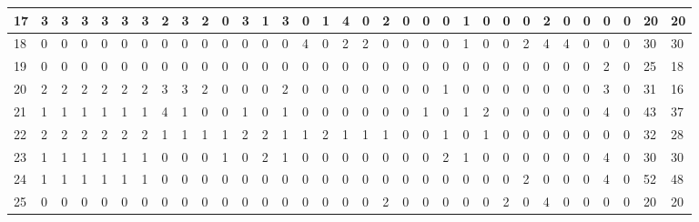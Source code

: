 \begin{table}[h!]
\begin{adjustwidth}{0.3in}{}
{{\begin{tabular}{l|l|l|l|l|l|l|l|l|l|l|l|l|l|l|l|l|l|l|l|l|l|l|l|l|l|l|l|l|l|l|l|l|}
	\hline
	\multicolumn{1}{|l|}{17}                                    & 3 & 3 & 3 & 3 & 3 & 3 & 2  & 3 & 2 & 0  & 3  & 1  & 3  & 0  & 1  & 4  & 0  & 2  & 0  & 0  & 0  & 1  & 0  & 0  & 0  & 2  & 0  & 0  & 0  & 0  & 20                 & 20                  \\ 
	\hline
	\multicolumn{1}{|l|}{18}                                    & 0 & 0 & 0 & 0 & 0 & 0 & 0  & 0 & 0 & 0  & 0  & 0  & 0  & 4  & 0  & 2  & 2  & 0  & 0  & 0  & 0  & 1  & 0  & 0  & 2  & 4  & 4  & 0  & 0  & 0  & 30                 & 30                  \\ 
	\hline
	\multicolumn{1}{|l|}{19}                                    & 0 & 0 & 0 & 0 & 0 & 0 & 0  & 0 & 0 & 0  & 0  & 0  & 0  & 0  & 0  & 0  & 0  & 0  & 0  & 0  & 0  & 0  & 0  & 0  & 0  & 0  & 0  & 0  & 2  & 0  & 25                 & 18                  \\ 
	\hline
	\multicolumn{1}{|l|}{20}                                    & 2 & 2 & 2 & 2 & 2 & 2 & 3  & 3 & 2 & 0  & 0  & 0  & 2  & 0  & 0  & 0  & 0  & 0  & 0  & 0  & 1  & 0  & 0  & 0  & 0  & 0  & 0  & 0  & 3  & 0  & 31                 & 16                  \\ 
	\hline
	\multicolumn{1}{|l|}{21}                                    & 1 & 1 & 1 & 1 & 1 & 1 & 4  & 1 & 0 & 0  & 1  & 0  & 1  & 0  & 0  & 0  & 0  & 0  & 0  & 1  & 0  & 1  & 2  & 0  & 0  & 0  & 0  & 0  & 4  & 0  & 43                 & 37                  \\ 
	\hline
	\multicolumn{1}{|l|}{22}                                    & 2 & 2 & 2 & 2 & 2 & 2 & 1  & 1 & 1 & 1  & 2  & 2  & 1  & 1  & 2  & 1  & 1  & 1  & 0  & 0  & 1  & 0  & 1  & 0  & 0  & 0  & 0  & 0  & 0  & 0  & 32                 & 28                  \\ 
	\hline
	\multicolumn{1}{|l|}{23}                                    & 1 & 1 & 1 & 1 & 1 & 1 & 0  & 0 & 0 & 1  & 0  & 2  & 1  & 0  & 0  & 0  & 0  & 0  & 0  & 0  & 2  & 1  & 0  & 0  & 0  & 0  & 0  & 0  & 4  & 0  & 30                 & 30                  \\ 
	\hline
	\multicolumn{1}{|l|}{24}                                    & 1 & 1 & 1 & 1 & 1 & 1 & 0  & 0 & 0 & 0  & 0  & 0  & 0  & 0  & 0  & 0  & 0  & 0  & 0  & 0  & 0  & 0  & 0  & 0  & 2  & 0  & 0  & 0  & 4  & 0  & 52                 & 48                  \\ 
	\hline
	\multicolumn{1}{|l|}{25}                                    & 0 & 0 & 0 & 0 & 0 & 0 & 0  & 0 & 0 & 0  & 0  & 0  & 0  & 0  & 0  & 0  & 0  & 2  & 0  & 0  & 0  & 0  & 0  & 2  & 0  & 4  & 0  & 0  & 0  & 0  & 20                 & 20                  \\ 

\end{tabular}}}
\end{adjustwidth}
\end{table}
